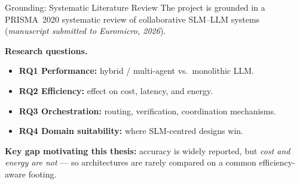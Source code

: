 \begin{block}{Grounding: Systematic Literature Review}
  The project is grounded in a PRISMA~2020 systematic review of collaborative
  SLM--LLM systems (\textit{manuscript submitted to Euromicro, 2026}).

  \vspace{6pt}
  \begin{center}
  \end{center}

  \vspace{4pt}
  \textbf{Research questions.}
  \begin{itemize}
    \item \textbf{RQ1 Performance:} hybrid / multi-agent vs.\ monolithic LLM.
    \item \textbf{RQ2 Efficiency:} effect on cost, latency, and energy.
    \item \textbf{RQ3 Orchestration:} routing, verification, coordination mechanisms.
    \item \textbf{RQ4 Domain suitability:} where SLM-centred designs win.
  \end{itemize}

  \textbf{Key gap motivating this thesis:} accuracy is widely reported, but
  \emph{cost and energy are not} --- so architectures are rarely compared on a
  common efficiency-aware footing.
\end{block}
